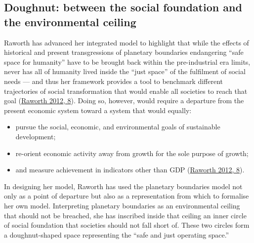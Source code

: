 \documentclass[a4paper, nobind]{templates/ociamthesis}
\providecommand{\tightlist}{%
  \setlength{\itemsep}{0pt}\setlength{\parskip}{0pt}}
\begin{document}
\hypertarget{doughnut-between-the-social-foundation-and-the-environmental-ceiling}{%
\subsection{Doughnut: between the social foundation and the environmental ceiling}\label{doughnut-between-the-social-foundation-and-the-environmental-ceiling}}

Raworth has advanced her integrated model to highlight that while the effects of historical and present transgressions of planetary boundaries endangering ``safe space for humanity'' have to be brought back within the pre-industrial era limits, never has all of humanity lived inside the ``just space'' of the fulfilment of social needs --- and thus her framework provides a tool to benchmark different trajectories of social transformation that would enable all societies to reach that goal (\protect\hyperlink{ref-raworth_safe_2012}{Raworth 2012, 8}). Doing so, however, would require a departure from the present economic system toward a system that would equally:

\begin{itemize}
\tightlist
\item
  pursue the social, economic, and environmental goals of sustainable development;
\item
  re-orient economic activity away from growth for the sole purpose of growth;
\item
  and measure achievement in indicators other than GDP (\protect\hyperlink{ref-raworth_safe_2012}{Raworth 2012, 8}).
\end{itemize}

In designing her model, Raworth has used the planetary boundaries model not only as a point of departure but also as a representation from which to formalise her own model. Interpreting planetary boundaries as an environmental ceiling that should not be breached, she has inscribed inside that ceiling an inner circle of social foundation that societies should not fall short of. These two circles form a doughnut-shaped space representing the ``safe and just operating space.''
\end{document}
